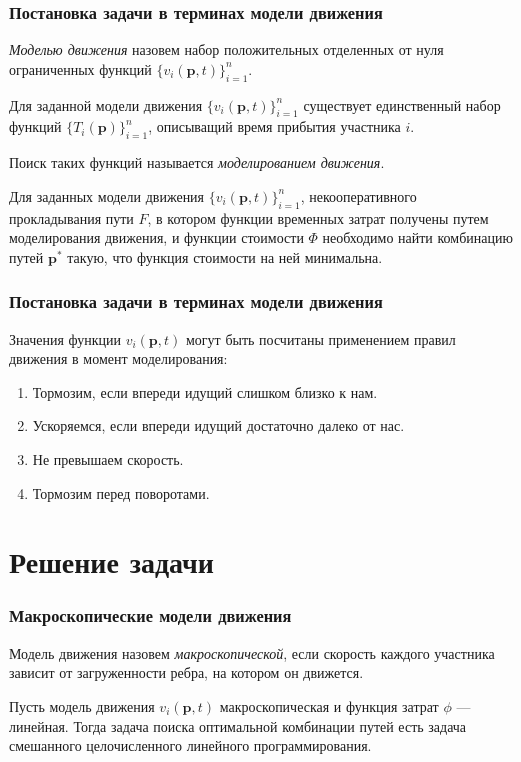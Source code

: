 \documentclass{beamer}
\begin{document}
\begin{frame}\frametitle{Постановка задачи в терминах модели движения}
\textit{Моделью движения} назовем набор положительных отделенных от нуля ограниченных функций $\{v_i(\textbf{p}, t)\}_{i = 1}^n$.

\begin{theorem}
	Для заданной модели движения $\{v_i(\textbf{p}, t)\}_{i = 1}^n$ существует единственный набор функций $\{T_i(\textbf{p})\}_{i = 1}^n$, описыващий время прибытия участника $i$.
\end{theorem}

Поиск таких функций называется \textit{моделированием движения}.

\bigskip

Для заданных модели движения $\{v_i(\textbf{p}, t)\}_{i = 1}^n$, некооперативного прокладывания пути $F$, в котором функции временных затрат получены путем моделирования движения, и функции стоимости $\Phi$ необходимо найти комбинацию путей $\textbf{p}^*$ такую, что функция стоимости на ней минимальна.

\end{frame}

\begin{frame}\frametitle{Постановка задачи в терминах модели движения}
	Значения функции $v_i(\textbf{p}, t)$ могут быть посчитаны применением правил движения в момент моделирования:
	\begin{enumerate}
		\item Тормозим, если впереди идущий слишком близко к нам.
		\item Ускоряемся, если впереди идущий достаточно далеко от нас.
		\item Не превышаем скорость.
		\item Тормозим перед поворотами.
	\end{enumerate}
\end{frame}

\section{Решение задачи}

\begin{frame}\frametitle{Макроскопические модели движения}
	Модель движения назовем \textit{макроскопической}, если скорость каждого участника зависит от загруженности ребра, на котором он движется.

	\begin{theorem}
	Пусть модель движения $ v_i(\textbf{p}, t)$ макроскопическая и функция затрат $\phi$ --- линейная. Тогда задача поиска оптимальной комбинации путей есть задача смешанного целочисленного линейного программирования.
	\end{theorem}
\end{frame}
\end{document}
